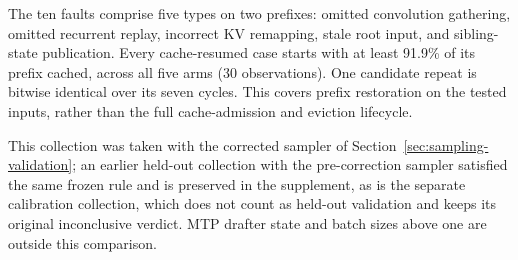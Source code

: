 The ten faults comprise five types on two prefixes: omitted convolution gathering, omitted recurrent replay, incorrect KV remapping, stale root input, and sibling-state publication. Every cache-resumed case starts with at least 91.9\% of its prefix cached, across all five arms (30 observations). One candidate repeat is bitwise identical over its seven cycles. This covers prefix restoration on the tested inputs, rather than the full cache-admission and eviction lifecycle.

This collection was taken with the corrected sampler of Section~\ref{sec:sampling-validation}; an earlier held-out collection with the pre-correction sampler satisfied the same frozen rule and is preserved in the supplement, as is the separate calibration collection, which does not count as held-out validation and keeps its original inconclusive verdict. MTP drafter state and batch sizes above one are outside this comparison.
